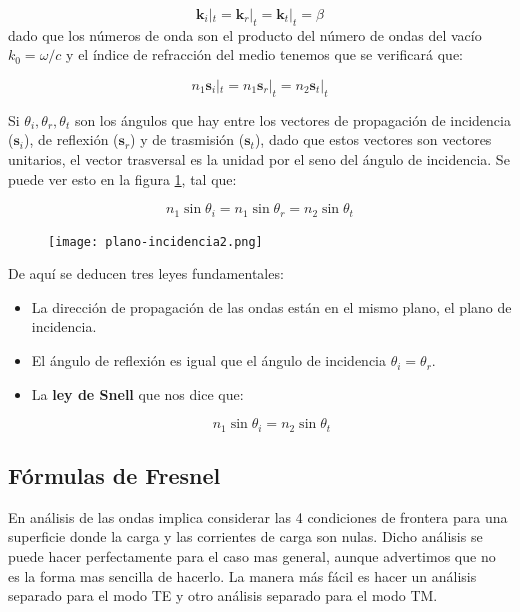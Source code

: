 \documentclass[12pt,a4paper]{article}
\newcommand{\kn}{\mathbf{k}}
\newcommand{\sn}{\mathbf{s}}
\numberwithin{equation}{section}
\numberwithin{figure}{section}
\begin{document}
\begin{equation}
\kn_i |_t = \kn_r |_t = \kn_t |_t = \beta \label{Ec:6.2.0.07}
\end{equation}
dado que los números de onda son el producto del número de ondas del vacío $k_0 = \omega/c$  y el índice de refracción del medio tenemos que se verificará que:

\begin{equation}
n_ 1 \sn_i |_t = n_1 \sn_r |_t = n_2 \sn_t |_t 
\end{equation}

Si $\theta_i,\theta_r,\theta_t$ son los ángulos que hay entre los vectores de propagación de incidencia ($\sn_i$), de reflexión ($\sn_r$) y de trasmisión ($\sn_t$), dado que estos vectores son vectores unitarios, el vector trasversal es la unidad por el seno del ángulo de incidencia. Se puede ver esto en la figura \ref{Fig:6.1.002}, tal que:

\begin{equation}
n_1 \sin \theta_i = 
n_1 \sin \theta_r = 
n_2 \sin \theta_t 
\end{equation}


\begin{figure}[h!] \centering
\texttt{[image: plano-incidencia2.png]}
\caption{}
\label{Fig:6.1.002}
\end{figure} 

De aquí se deducen tres leyes fundamentales:

\begin{itemize}
\item La dirección de propagación de las ondas están en el mismo plano, el plano de incidencia.
\item El ángulo de reflexión es igual que el ángulo de incidencia $\theta_i = \theta_r$.
\item La \textbf{ley de Snell} que nos dice que: 

\begin{equation} 
n_1 \sin \theta_i = n_2 \sin \theta_t \label{Ec:6.1.003}
\end{equation}

\end{itemize}

\subsection{Fórmulas de Fresnel}
En análisis de las ondas implica considerar las 4 condiciones de frontera para una superficie donde la carga y las corrientes de carga son nulas. Dicho análisis se puede hacer perfectamente para el caso mas general, aunque advertimos que no es la forma mas sencilla de hacerlo. La manera más fácil es hacer un análisis separado para el modo TE y otro análisis separado para el modo TM. \\
\end{document}

